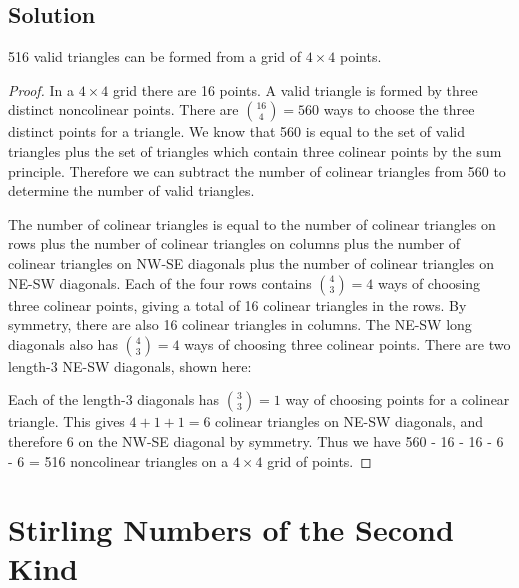 \documentclass[12pt]{article}
\begin{document}
\subsection*{Solution}
516 valid triangles can be formed from a grid of $4 \times 4$ points. 
\begin{proof}
    

In a $4 \times 4$ grid there are 16 points. A valid triangle is formed by three distinct noncolinear points. There are $\binom{16}{4} = 560$ ways to choose the three distinct points for a triangle. We know that 560 is equal to the set of valid triangles plus the set of triangles which contain three colinear points by the sum principle. Therefore we can subtract the number of colinear triangles from 560 to determine the number of valid triangles.

    The number of colinear triangles is equal to the number of colinear triangles on rows plus the number of colinear triangles on columns plus the number of colinear triangles on NW-SE diagonals plus the number of colinear triangles on NE-SW diagonals. 
    Each of the four rows contains $\binom{4}{3} = 4$ ways of choosing three colinear points, giving a total of 16 colinear triangles in the rows. By symmetry, there are also 16 colinear triangles in columns. The NE-SW long diagonals also has $\binom{4}{3} = 4$ ways of choosing three colinear points. There are two length-3 NE-SW diagonals, shown here: 

\begin{center}
\end{center}

Each of the length-3 diagonals has $\binom{3}{3} = 1$ way of choosing points for a colinear triangle. This gives $4+1+1 = 6$ colinear triangles on NE-SW diagonals, and therefore 6 on the NW-SE diagonal by symmetry. Thus we have 560 - 16 - 16 - 6 - 6 = 516 noncolinear triangles on a $4 \times 4$ grid of points. 
\end{proof}

\section{Stirling Numbers of the Second Kind}
\end{document}
